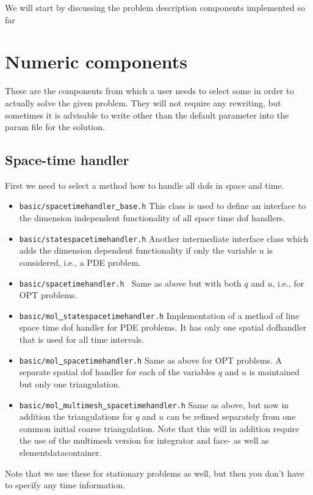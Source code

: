 We will start by discussing the problem description components implemented so far


\section{Numeric components}
These are the components from which a user needs to select some in order to actually 
solve the given problem. They will not require any rewriting, but sometimes it is 
advisable to write other than the default parameter into the param file for the 
solution.

\subsection{Space-time handler}
First we need to select a method how to handle all dofs in space and time.
\begin{itemize}
\item \texttt{basic/spacetimehandler\underline{ }base.h} This class is used to define 
  an interface to the dimension independent functionality of all space time dof handlers.
\item \texttt{basic/statespacetimehandler.h} Another intermediate interface class which adds 
  the dimension dependent functionality if only the variable $u$ is considered, i.e., a 
  PDE problem.
\item \texttt{basic/spacetimehandler.h } Same as above but with both $q$ and $u$, i.e., for
  OPT problems.
\item \texttt{basic/mol\underline{ }statespacetimehandler.h} Implementation of a method of 
  line space time dof handler for PDE problems. It has only one spatial 
  dofhandler that is used for all time intervals.
\item \texttt{basic/mol\underline{ }spacetimehandler.h} Same as above for OPT problems.
  A separate spatial dof handler for each of the variables $q$ and $u$ is maintained 
  but only one triangulation.
\item \texttt{basic/mol\underline{ }multimesh\underline{ }spacetimehandler.h}
  Same as above, but now in addition the triangulations for $q$ and $u$ can be refined
  separately from one common initial coarse triangulation. Note that this will
  in addition require the use of the multimesh version for integrator and 
  face- as well as elementdatacontainer.
\end{itemize}
Note that we use these for stationary problems as well, but then you don't have to specify
any time information.

